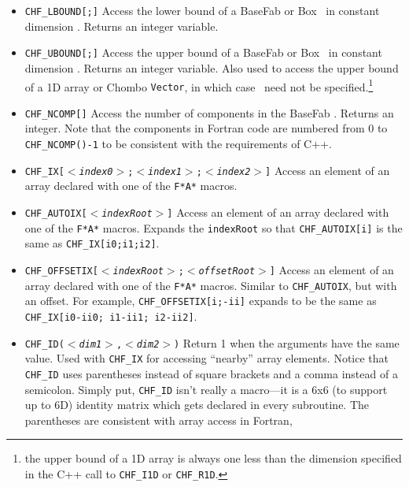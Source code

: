 \begin{itemize}
\item {\tt CHF\_LBOUND[\argv;\dimv]} Access the lower bound of
a BaseFab or Box \argv\ in constant
dimension \dimv.  Returns an integer variable.
\item {\tt CHF\_UBOUND[\argv;\dimv]} Access the upper bound of
a BaseFab or Box \argv\ in constant 
dimension \dimv.  Returns an integer variable.
Also used to access the upper bound of a 1D array or Chombo {\tt Vector}, 
in which case \dimv\ need not be specified.\footnote{the upper bound of
a 1D array is always one less than the dimension specified in the C++
call to {\tt CHF\_I1D} or {\tt CHF\_R1D}.}
\item {\tt CHF\_NCOMP[\argv]} Access the number of components in 
the BaseFab \argv.  Returns an integer.  Note that the components in Fortran code are
numbered from 0 to {\tt CHF\_NCOMP(\argv)-1} 
to be consistent with the requirements of C++.
\item {\tt CHF\_IX[$<${\em index0}$>$;$<${\em index1}$>$;$<${\em index2}$>$]}
Access an element of an array declared with one of the {\tt F*A*}
macros.

\item {\tt CHF\_AUTOIX[$<${\em indexRoot}$>$]}
Access an element of an array declared with one of the {\tt F*A*}
macros. Expands the {\tt indexRoot} so that {\tt CHF\_AUTOIX[i]} is
the same as {\tt CHF\_IX[i0;i1;i2]}.

\item {\tt CHF\_OFFSETIX[$<${\em indexRoot}$>$;$<${\em offsetRoot}$>$]}
Access an element of an array declared with one of the {\tt F*A*}
macros. Similar to {\tt CHF\_AUTOIX}, but with an offset.  For
example, {\tt CHF\_OFFSETIX[i;-ii]} expands to be the same as {\tt
  CHF\_IX[i0-ii0; i1-ii1; i2-ii2]}. 

\item {\tt CHF\_ID($<${\em dim1}$>$,$<${\em dim2}$>$)} Return 1 when the
arguments have the same value.  Used with {\tt CHF\_IX} for accessing
``nearby'' array elements.  
 Notice that {\tt CHF\_ID} uses
parentheses instead of square brackets and a comma instead of a
semicolon.  
Simply put, {\tt CHF\_ID}
isn't really a macro---it is a 6x6 (to support up to 6D) identity
matrix which gets declared in every subroutine.  The parentheses are
consistent with array access in Fortran, 
\end{itemize}

